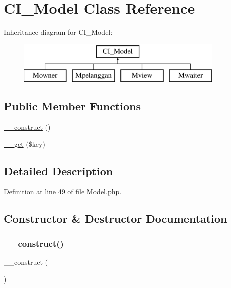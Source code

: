 \hypertarget{class_c_i___model}{}\section{C\+I\+\_\+\+Model Class Reference}
\label{class_c_i___model}
Inheritance diagram for C\+I\+\_\+\+Model\+:\begin{figure}[H]
\begin{center}
\leavevmode
\includegraphics[height=2.000000cm]{class_c_i___model}
\end{center}
\end{figure}
\subsection*{Public Member Functions}
\begin{DoxyCompactItemize}
\item 
\mbox{\hyperlink{class_c_i___model_a095c5d389db211932136b53f25f39685}{\+\_\+\+\_\+construct}} ()
\item 
\mbox{\hyperlink{class_c_i___model_a4537dad3b44254124991341cc91b28fb}{\+\_\+\+\_\+get}} (\$key)
\end{DoxyCompactItemize}


\subsection{Detailed Description}


Definition at line 49 of file Model.\+php.



\subsection{Constructor \& Destructor Documentation}
\mbox{\label{class_c_i___model_a095c5d389db211932136b53f25f39685}} 
\subsubsection{\texorpdfstring{\_\_construct()}{\_\_construct()}}
{\footnotesize\ttfamily \+\_\+\+\_\+construct (\begin{DoxyParamCaption}{ }\end{DoxyParamCaption})}

